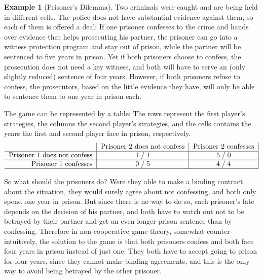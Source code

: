 \documentclass[a4paper,DIV=11,abstracton,twoside=semi]{scrreprt}
\theoremstyle{definition}
\newtheorem{ex}[thm]{Example} %
\begin{document}
    \begin{ex}[Prisoner's Dilemma]
        Two criminals were caught and are being held in different cells. The police does not have substantial evidence against them, so each of them is offered a deal: If one prisoner confesses to the crime and hands over evidence that helps prosecuting his partner, the prisoner can go into a witness protection program and stay out of prison, while the partner will be sentenced to five years in prison. Yet if both prisoners choose to confess, the prosecution does not need a key witness, and both will have to serve an (only slightly reduced) sentence of four years. However, if both prisoners refuse to confess, the prosecutors, based on the little evidence they have, will only be able to sentence them to one year in prison each.
        
        The game can be represented by a table: 
        The rows represent the first player's strategies, the columns the second player's strategies,  and the cells contains the years the first and second player face in prison, respectively.
        \begin{gather*}
            \centering
            \begin{tabular}{r|c|c|}
            	                    & Prisoner 2 does not confess & Prisoner 2 confesses \\ \hline
            	Prisoner 1 does not confess &       1\;/\;1       &   5\;/\;0    \\ \hline
            	   Prisoner 1 confesses     &       0\;/\;5       &   4\;/\;4    \\ \hline
            \end{tabular}
        \end{gather*}
    
        
        So what should the prisoners do?
        Were they able to make a binding contract about the situation, they would surely agree about not confessing, and both only spend one year in prison. But since there is no way to do so, each prisoner's fate depends on the decision of his partner, and both have to watch out not to be betrayed by their partner and get an even longer prison sentence than by confessing.
        Therefore in non-cooperative game theory, somewhat counter-intuitively, the solution to the game is that both prisoners confess and both face four years in prison instead of just one.
        They both have to accept going to prison for four years, since they cannot make binding agreements, and this is the only way to avoid being betrayed by the other prisoner.
        \label{ex:prisonersDilemma}
        \label{ex:gameTheoryIntroductoryExample}
    \end{ex}
\end{document}
